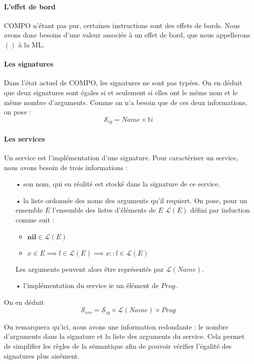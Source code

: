 \documentclass[11pt,a4paper,fleqn]{report}
\newcommand{\Sig}{\mathcal{S}_{ig}}
\newcommand{\Serv}{\mathcal{S}_{erv}}
\begin{document}
\paragraph{L'effet de bord}
COMPO n'étant pas pur, certaines instructions sont des effets de bords. Nous avons donc besoins d'une valeur associée à un effet de bord, que nous appellerons $()$ à la ML.

\paragraph{Les signatures}
Dans l'état actuel de COMPO, les signatures ne sont pas typées. On en déduit que deux signatures sont égales si et seulement si elles ont le même nom et le même nombre d'arguments. Comme on n'a besoin que de ces deux informations, on  pose :
\[\Sig = Name \times \mathbb{N}\]

\paragraph{Les services}
Un service est l'implémentation d'une signature. Pour caractériser un service, nous avons besoin de trois informations : 
\begin{itemize}
\item[•] son \textsf{nom}, qui en réalité est stocké dans la signature de ce service.
\item[•] la liste ordonnée des noms des \textsf{arguments} qu'il requiert. On pose, pour un ensemble $E$ l'ensemble des listes d'éléments de $E$ $\mathcal{L}(E)$ défini par induction comme suit : 
\begin{itemize}
\item $ \mathbf{nil} \in \mathcal{L}(E)$
\item $ x \in E  \implies l \in \mathcal{L}(E) \implies x::l \in \mathcal{L}(E) $
\end{itemize}

Les arguments peuvent alors être représentés par $\mathcal{L}(Name)$.
\item[•] l'\textsf{implémentation} du service ie un élément de $Prog$.
\end{itemize}
On en déduit
\[\Serv = \Sig \times \mathcal{L}(Name)\times Prog\]

On remarquera qu'ici, nous avons une information redondante : le nombre d'arguments dans la signature et la liste des arguments du service. Cela permet de simplifier les règles de la sémantique afin de pouvoir vérifier l'égalité des signatures plus aisément. 
\end{document}
